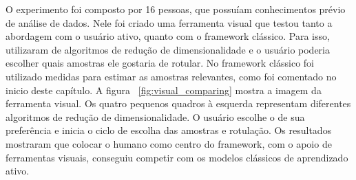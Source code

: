 O experimento foi composto por 16 pessoas, que possuíam conhecimentos prévio de análise de dados. Nele foi criado uma ferramenta visual que testou tanto a abordagem com o usuário ativo, quanto com o framework clássico. Para isso, utilizaram de algoritmos de redução de dimensionalidade e o usuário poderia escolher quais amostras ele gostaria de rotular. No framework clássico foi utilizado medidas para estimar as amostras relevantes, como foi comentado no inicio deste capítulo. A figura ~\ref{fig:visual_comparing} mostra a imagem da ferramenta visual. Os quatro pequenos quadros à esquerda representam diferentes algoritmos de redução de dimensionalidade. O usuário escolhe o de sua preferência e inicia o ciclo de escolha das amostras e rotulação. Os resultados mostraram que colocar o humano como centro do framework, com o apoio de ferramentas visuais, conseguiu competir com os modelos clássicos de aprendizado ativo. 










